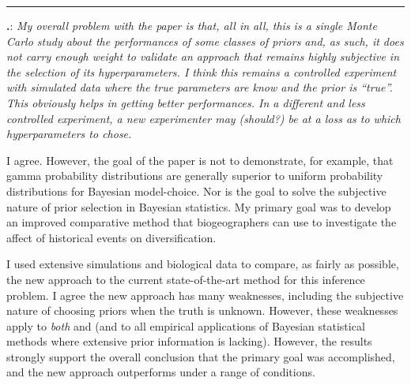 \documentclass[12pt]{article}
\newcounter{commentCounter}
\newcommand{\revcomment}[1]{{\addtocounter{commentCounter}{1}}
    \medskip \hrule \noindent
\textbf{\arabic{section}.\arabic{commentCounter}}: {\sl #1}\par\xspace}
\newcommand{\response}[1]{{\addtolength{\leftskip}{0.25in} #1\par}\xspace}
\begin{document}
\revcomment{
    My overall problem with the paper is that, all in all, this is a single
    Monte Carlo study about the performances of some classes of priors and, as
    such, it does not carry enough weight to validate an approach that remains
    highly subjective in the selection of its hyperparameters. I think this
    remains a controlled experiment with simulated data where the true
    parameters are know and the prior is ``true''. This obviously helps in
    getting better performances. In a different and less controlled experiment,
    a new experimenter may (should?) be at a loss as to which hyperparameters
    to chose.
}
\response{
    I agree. However, the goal of the paper is not to demonstrate, for example,
    that gamma probability distributions are generally superior to uniform
    probability distributions for Bayesian model-choice. Nor is the goal to
    solve the subjective nature of prior selection in Bayesian statistics.
    My primary goal was to develop an improved comparative method that
    biogeographers can use to investigate the affect of historical events on
    diversification.

    I used extensive simulations and biological data to compare, as fairly as
    possible, the new approach to the current state-of-the-art method for this
    inference problem. I agree the new approach has many weaknesses, including
    the subjective nature of choosing priors when the truth is unknown.
    However, these weaknesses apply to \emph{both} \dppmsbayes and \msb
    (and to all empirical applications of Bayesian statistical methods where
    extensive prior information is lacking). However, the results strongly
    support the overall conclusion that the primary goal was accomplished, and
    the new approach outperforms \msb under a range of conditions.
}
\end{document}
